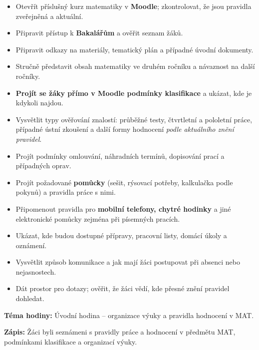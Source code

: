 \documentclass[11pt,a4paper]{article}
\begin{document}
\begin{itemize}[label=$\square$]
  \item Otevřít příslušný kurz matematiky v \textbf{Moodle}; zkontrolovat, že jsou pravidla zveřejněná a aktuální.
  \item Připravit přístup k \textbf{Bakalářům} a ověřit seznam žáků.
  \item Připravit odkazy na materiály, tematický plán a případné úvodní dokumenty.
\end{itemize}

\begin{itemize}[label=$\square$]
  \item Stručně představit obsah matematiky ve druhém ročníku a návaznost na další ročníky.
  \item \textbf{Projít se žáky přímo v Moodle podmínky klasifikace} a ukázat, kde je kdykoli najdou.
  \item Vysvětlit typy ověřování znalostí: průběžné testy, čtvrtletní a pololetní práce, případné ústní zkoušení a další formy hodnocení \emph{podle aktuálního znění pravidel}.
  \item Projít podmínky omlouvání, náhradních termínů, dopisování prací a případných oprav.
  \item Projít požadované \textbf{pomůcky} (sešit, rýsovací potřeby, kalkulačka podle pokynů) a pravidla práce s nimi.
  \item Připomenout pravidla pro \textbf{mobilní telefony, chytré hodinky} a jiné elektronické pomůcky zejména při písemných pracích.
  \item Ukázat, kde budou dostupné přípravy, pracovní listy, domácí úkoly a oznámení.
  \item Vysvětlit způsob komunikace a jak mají žáci postupovat při absenci nebo nejasnostech.
  \item Dát prostor pro dotazy; ověřit, že žáci vědí, kde přesné znění pravidel dohledat.
\end{itemize}


\begin{zadaniBox}[title={Poznámka pro učitele - Zápis do Bakalářů}]
\textbf{Téma hodiny:} Úvodní hodina -- organizace výuky a pravidla hodnocení v MAT.

\medskip
\textbf{Zápis:} Žáci byli seznámeni s pravidly práce a hodnocení v předmětu MAT, podmínkami klasifikace a organizací výuky.
\end{zadaniBox}
\end{document}
